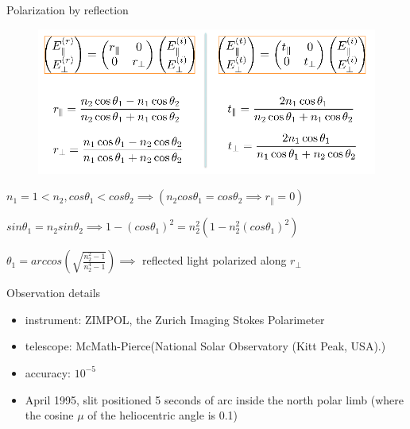 \documentclass{beamer}
\begin{document}
\begin{frame}{Polarization by reflection}
\begin{figure}[H]
 \centering
 \includegraphics[scale=0.5]{a6.png}
\end{figure}
$n_1 = 1 < n_2, cos \theta_1 < cos \theta_2 \implies ( n_2 cos \theta_1 = cos \theta_2 \implies r_{\parallel} = 0) $

$sin \theta_1 = n_2 sin \theta_2 \implies 1 - (cos \theta_1)^2 = n_2^2 (1 - n_2^2 (cos \theta_1)^2) $

$ \theta_1 = arccos (\sqrt{\frac{n_2^2 -1}{n_2^4-1}}) \implies  $ reflected light polarized along $r_{\perp}$
\end{frame}
\begin{frame}{Observation details}
\begin{itemize}

\item instrument: ZIMPOL, the Zurich Imaging Stokes Polarimeter 
\item telescope: McMath-Pierce(National Solar Observatory (Kitt Peak, USA).)
\item accuracy: $10^{-5}$
\item April 1995, slit positioned 5 seconds of arc inside the north polar limb 
(where the cosine $\mu$ of the heliocentric angle is 0.1)
\end{itemize}
\end{frame}
\end{document}
